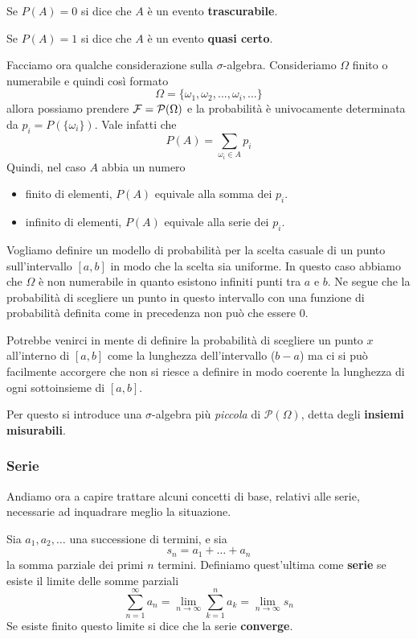 \begin{definition}
	Se $P(A) = 0$ si dice che $A$ è un evento \textbf{trascurabile}.
\end{definition}

\begin{definition}
	Se $P(A) = 1$ si dice che $A$ è un evento \textbf{quasi certo}.
\end{definition}

Facciamo ora qualche considerazione sulla $\sigma$-algebra. Consideriamo $\Omega$ finito o
numerabile e quindi così formato
\[ \Omega = \{ \omega_1, \omega_2, ..., \omega_i, ... \} \]
allora possiamo prendere $\mathcal{F} = \mathcal{P}(\Omega)$ e la probabilità è univocamente determinata
da $p_i = P(\{ \omega_i \})$. Vale infatti che
\[ P(A) = \sum_{\omega_i \in A} p_i \]
Quindi, nel caso $A$ abbia un numero
\begin{itemize}
	\item finito di elementi, $P(A)$ equivale alla somma dei $p_i$.
	\item infinito di elementi, $P(A)$ equivale alla serie dei $p_i$.
\end{itemize}

\begin{example}
	Vogliamo definire un modello di probabilità per la scelta casuale di un punto sull'intervallo
	$[a,b]$ in modo che la scelta sia uniforme. In questo caso abbiamo che $\Omega$ è non
	numerabile in quanto esistono infiniti punti tra $a$ e $b$. Ne segue che la probabilità di
	scegliere un punto in questo intervallo con una funzione di probabilità definita come in
	precedenza non può che essere 0.

	Potrebbe venirci in mente di definire la probabilità di scegliere un punto $x$ all'interno di
	$[a,b]$ come la lunghezza dell'intervallo ($b-a$) ma ci si può facilmente accorgere che non
	si riesce a definire in modo coerente la lunghezza di ogni sottoinsieme di $[a,b]$.

	Per questo si introduce una $\sigma$-algebra più \emph{piccola} di $\mathcal{P}(\Omega)$,
	detta degli \textbf{insiemi misurabili}.
\end{example}

\subsubsection{Serie}
Andiamo ora a capire trattare alcuni concetti di base, relativi alle serie, necessarie ad
inquadrare meglio la situazione.

\begin{definition}
	Sia $a_1, a_2, \dots$ una successione di termini, e sia
	\[ s_n = a_1 + \dots + a_n \]
	la somma parziale dei primi $n$ termini. Definiamo quest'ultima come \textbf{serie} se esiste
	il limite delle somme parziali
	\[ \sum_{n=1}^\infty a_n = \lim_{n \to \infty} \sum_{k=1}^n a_k = \lim_{n \to \infty} s_n \]
	Se esiste finito questo limite si dice che la serie \textbf{converge}.
\end{definition}

